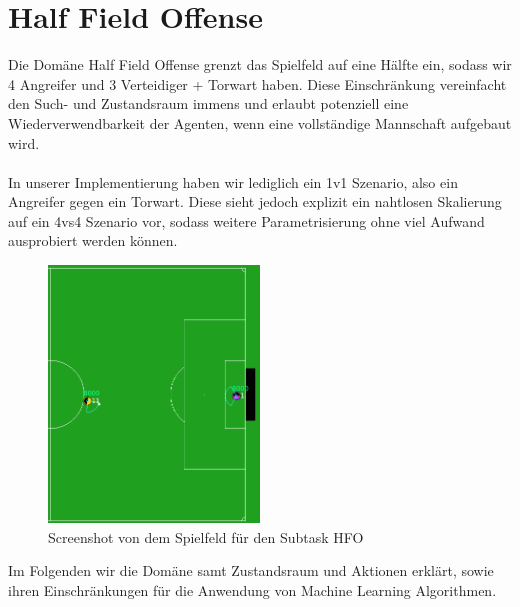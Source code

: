     \section{Half Field Offense}

        Die Domäne Half Field Offense grenzt das Spielfeld auf eine Hälfte ein, sodass wir 4 Angreifer und 3 Verteidiger + Torwart haben. Diese Einschränkung vereinfacht den Such- und Zustandsraum immens und erlaubt potenziell eine Wiederverwendbarkeit der Agenten, wenn eine vollständige Mannschaft aufgebaut wird.\\
        \\
        In unserer Implementierung haben wir lediglich ein 1v1 Szenario, also ein Angreifer gegen ein Torwart. Diese sieht jedoch explizit ein nahtlosen Skalierung auf ein 4vs4 Szenario vor, sodass weitere Parametrisierung ohne viel Aufwand ausprobiert werden können.\\

        \begin{figure}[htbp]
            \includegraphics[width = 0.5\textwidth,height = 0.4\textheight, center]{../pictures/half-field.png}
            \caption{Screenshot von dem Spielfeld für den Subtask HFO \label{fig:somelabel}}
        \end{figure}
        \noindent
        Im Folgenden wir die Domäne samt Zustandsraum und Aktionen erklärt, sowie ihren Einschränkungen für die Anwendung von Machine Learning Algorithmen.\\
\newpage
